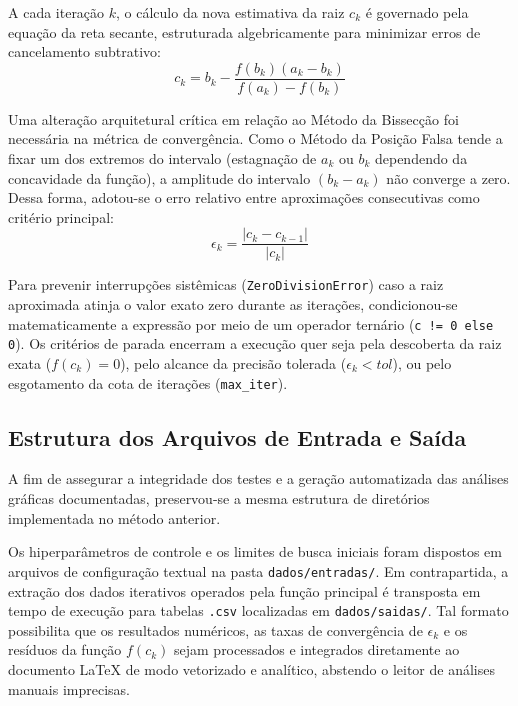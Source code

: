 A cada iteração $k$, o cálculo da nova estimativa da raiz $c_k$ é governado pela equação da reta secante, estruturada algebricamente para minimizar erros de cancelamento subtrativo:
\begin{equation}
    c_k = b_k - \frac{f(b_k)(a_k - b_k)}{f(a_k) - f(b_k)}
    \label{eq:posicao_falsa_ck}
\end{equation}

Uma alteração arquitetural crítica em relação ao Método da Bissecção foi necessária na métrica de convergência. Como o Método da Posição Falsa tende a fixar um dos extremos do intervalo (estagnação de $a_k$ ou $b_k$ dependendo da concavidade da função), a amplitude do intervalo $(b_k - a_k)$ não converge a zero. Dessa forma, adotou-se o erro relativo entre aproximações consecutivas como critério principal:
\begin{equation}
    \epsilon_k = \frac{|c_k - c_{k-1}|}{|c_k|}
    \label{eq:erro_posicao_falsa}
\end{equation}

Para prevenir interrupções sistêmicas (\texttt{ZeroDivisionError}) caso a raiz aproximada atinja o valor exato zero durante as iterações, condicionou-se matematicamente a expressão por meio de um operador ternário (\texttt{c != 0 else 0}). Os critérios de parada encerram a execução quer seja pela descoberta da raiz exata ($f(c_k) = 0$), pelo alcance da precisão tolerada ($\epsilon_k < tol$), ou pelo esgotamento da cota de iterações (\texttt{max\_iter}).

\subsection{Estrutura dos Arquivos de Entrada e Saída}
\label{subsec:estrutura_arquivos_posicao_falsa}

A fim de assegurar a integridade dos testes e a geração automatizada das análises gráficas documentadas, preservou-se a mesma estrutura de diretórios implementada no método anterior. 

Os hiperparâmetros de controle e os limites de busca iniciais foram dispostos em arquivos de configuração textual na pasta \texttt{dados/entradas/}. Em contrapartida, a extração dos dados iterativos operados pela função principal é transposta em tempo de execução para tabelas \texttt{.csv} localizadas em \texttt{dados/saidas/}. Tal formato possibilita que os resultados numéricos, as taxas de convergência de $\epsilon_k$ e os resíduos da função $f(c_k)$ sejam processados e integrados diretamente ao documento LaTeX de modo vetorizado e analítico, abstendo o leitor de análises manuais imprecisas.

